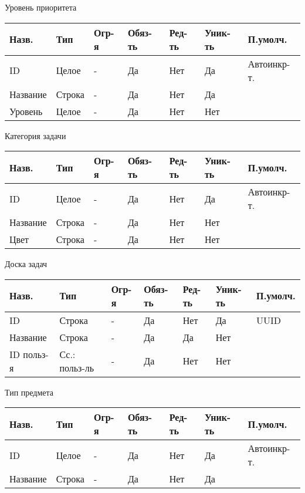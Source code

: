\documentclass[../document.tex]{subfiles}
\begin{document}
Уровень приоритета

\begin{tabular}{ | l | l | l | l | l | l | l | }
  \hline
  Назв.    & Тип    & Огр-я & Обяз-ть & Ред-ть & Уник-ть & П.умолч.    \\
  \hline
  ID       & Целое  & -     & Да      & Нет    & Да      & Автоинкр-т. \\
  Название & Строка & -     & Да      & Нет    & Да      &             \\
  Уровень  & Целое  & -     & Да      & Нет    & Нет     &             \\
  \hline
\end{tabular}

Категория задачи

\begin{tabular}{ | l | l | l | l | l | l | l | }
  \hline
  Назв.    & Тип    & Огр-я & Обяз-ть & Ред-ть & Уник-ть & П.умолч.    \\
  \hline
  ID       & Целое  & -     & Да      & Нет    & Да      & Автоинкр-т. \\
  Название & Строка & -     & Да      & Нет    & Нет     &             \\
  Цвет     & Строка & -     & Да      & Нет    & Нет     &             \\
  \hline
\end{tabular}

Доска задач

\begin{tabular}{ | l | l | l | l | l | l | l | }
  \hline
  Назв.      & Тип           & Огр-я & Обяз-ть & Ред-ть & Уник-ть & П.умолч. \\
  \hline
  ID         & Строка        & -     & Да      & Нет    & Да      & UUID     \\
  Название   & Строка        & -     & Да      & Да     & Нет     &          \\
  ID польз-я & Сс.: польз-ль & -     & Да      & Нет    & Нет     &          \\
  \hline
\end{tabular}

Тип предмета

\begin{tabular}{ | l | l | l | l | l | l | l | }
  \hline
  Назв.    & Тип    & Огр-я & Обяз-ть & Ред-ть & Уник-ть & П.умолч.    \\
  \hline
  ID       & Целое  & -     & Да      & Нет    & Да      & Автоинкр-т. \\
  Название & Строка & -     & Да      & Нет    & Да      &             \\
  \hline
\end{tabular}
\end{document}
